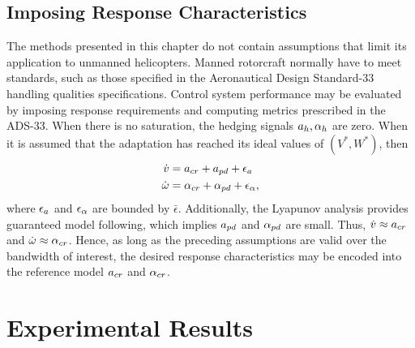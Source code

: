 \subsection{Imposing Response Characteristics}
\label{r:performancemetrics}The methods presented in this chapter do
not contain assumptions that limit its application to unmanned
helicopters. Manned rotorcraft normally have to meet standards, such
as those specified in the Aeronautical Design Standard-33
\cite{ads33e} handling qualities specifications. Control system
performance\cite{civita:gnc:02,rysdyk:itcst:2005} may be evaluated by
imposing response requirements and computing metrics prescribed in
the ADS-33. When there is no saturation, the hedging signals
$a_{h},\alpha_{h}$ are zero. When it is assumed that the adaptation has
reached its ideal values of $(V^*,W^*)$, then
\[
\begin{split}
\dot{v} &= a_{cr} + a_{pd} + \epsilon_a\nonumber \\
\dot{\omega} &= \alpha_{cr} + \alpha_{pd} + \epsilon_{\alpha},
\end{split}
\]
where $\epsilon_a$ and $\epsilon_{\alpha}$ are bounded by
$\bar{\epsilon}$. Additionally, the Lyapunov analysis provides
guaranteed model following, which implies $a_{pd}$ and $\alpha_{pd}$ are
small. Thus, $\dot{v} \approx a_{cr}$ and $\dot{\omega} \approx \alpha_{cr}$. Hence, as
long as the preceding assumptions are valid over the bandwidth of
interest, the desired response characteristics may be encoded into
the reference model $a_{cr}$ and $\alpha_{cr}$.
%





\newlength{\myfigheight}%
\newlength{\mytfigheight}%
\setlength{\myfigheight}{0.40\textheight}
\setlength{\mytfigheight}{0.33\textheight}

\newlength{\subfigwidth}%
\newlength{\subfigcolsep}%
\setlength{\subfigcolsep}{2\tabcolsep}%
\section{Experimental Results}
\label{c:results}

